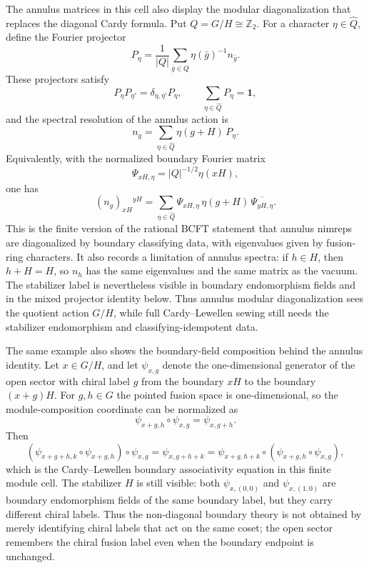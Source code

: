 The annulus matrices in this cell also display the modular diagonalization
that replaces the diagonal Cardy formula.  Put \(Q=G/H\cong\mathbb Z_2\).
For a character \(\eta\in\widehat Q\), define the Fourier projector
\begin{equation}
  P_\eta
  =
  \frac1{|Q|}\sum_{\bar g\in Q}\eta(\bar g)^{-1}n_{\bar g}.
  \label{eq:bcft-pointed-coset-fourier-projector}
\end{equation}
These projectors satisfy
\[
  P_\eta P_{\eta'}=\delta_{\eta,\eta'}P_\eta,
  \qquad
  \sum_{\eta\in\widehat Q}P_\eta=\mathbf 1,
\]
and the spectral resolution of the annulus action is
\begin{equation}
  n_g
  =
  \sum_{\eta\in\widehat Q}\eta(g+H)\,P_\eta .
  \label{eq:bcft-pointed-coset-nimrep-diagonalization}
\end{equation}
Equivalently, with the normalized boundary Fourier matrix
\[
  \Psi_{xH,\eta}=|Q|^{-1/2}\eta(xH),
\]
one has
\begin{equation}
  (n_g)_{xH}{}^{yH}
  =
  \sum_{\eta\in\widehat Q}
  \Psi_{xH,\eta}\,\eta(g+H)\,\overline{\Psi_{yH,\eta}} .
  \label{eq:bcft-pointed-coset-annulus-fourier}
\end{equation}
This is the finite version of the rational BCFT statement that annulus
nimreps are diagonalized by boundary classifying data, with eigenvalues
given by fusion-ring characters.  It also records a limitation of annulus
spectra: if \(h\in H\), then \(h+H=H\), so \(n_h\) has the same eigenvalues
and the same matrix as the vacuum.  The stabilizer label is nevertheless
visible in boundary endomorphism fields and in the mixed projector identity
below.  Thus annulus modular diagonalization sees the quotient action
\(G/H\), while full Cardy--Lewellen sewing still needs the stabilizer
endomorphism and classifying-idempotent data.

The same example also shows the boundary-field composition behind the
annulus identity.  Let \(x\in G/H\), and let
\(\psi_{x,g}\) denote the one-dimensional generator of the open sector with
chiral label \(g\) from the boundary \(xH\) to the boundary \((x+g)H\).
For \(g,h\in G\) the pointed fusion space is one-dimensional, so the
module-composition coordinate can be normalized as
\begin{equation}
  \psi_{x+g,h}\circ\psi_{x,g}
  =
  \psi_{x,g+h}.
  \label{eq:bcft-pointed-coset-boundary-ope}
\end{equation}
Then
\[
  (\psi_{x+g+h,k}\circ\psi_{x+g,h})\circ\psi_{x,g}
  =
  \psi_{x,g+h+k}
  =
  \psi_{x+g,h+k}\circ(\psi_{x+g,h}\circ\psi_{x,g}),
\]
which is the Cardy--Lewellen boundary associativity equation in this
finite module cell.  The stabilizer \(H\) is still visible: both
\(\psi_{x,(0,0)}\) and \(\psi_{x,(1,0)}\) are boundary endomorphism fields
of the same boundary label, but they carry different chiral labels.  Thus the
non-diagonal boundary theory is not obtained by merely identifying chiral
labels that act on the same coset; the open sector remembers the chiral
fusion label even when the boundary endpoint is unchanged.

